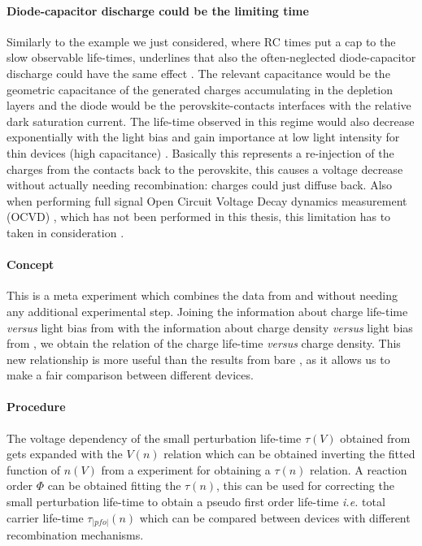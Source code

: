		\paragraph{Diode\hyp{}capacitor discharge could be the limiting time}
		Similarly to the example we just considered, where RC times put a cap to the slow observable life\hyp{}times,  underlines that also the often-neglected diode\hyp{}capacitor discharge could have the same effect \cite{Tvingstedt2017,Hellen2003}.
		The relevant capacitance would be the geometric capacitance of the generated charges accumulating in the depletion layers and the diode would be the perovskite-contacts interfaces with the relative dark saturation current.
		The life\hyp{}time observed in this regime would also decrease exponentially with the light bias \cite{Castaner1981} and gain importance at low light intensity for thin devices (high capacitance) \cite{Kiermasch2018}.
		Basically this represents a re\hyp{}injection of the charges from the contacts back to the perovskite, this causes a voltage decrease without actually needing recombination: charges could just diffuse back.
		Also when performing full signal Open Circuit Voltage Decay dynamics measurement (OCVD) \cite{Lederhandler1955,Mahan1981}, which has not been performed in this thesis, this limitation has to taken in consideration \cite{Tvingstedt2017,Pockett2017,Pockett2015,Kiermasch2018}.

		\FloatBarrier
		\newpage
		\label{characterization-tpvce}

		\paragraph{Concept}
		This is a meta experiment which combines the data from  and  without needing any additional experimental step.
		Joining the information about charge life\hyp{}time \textsl{versus} light bias from  with the information about charge density \textsl{versus} light bias from , we obtain the relation of the charge life\hyp{}time \textsl{versus} charge density.
		This new relationship is more useful than the results from bare , as it allows us to make a fair comparison between different devices.

		\paragraph{Procedure}
		The voltage dependency of the small perturbation life\hyp{}time $\tau(V)$ obtained from  gets expanded with the $V(n)$ relation which can be obtained inverting the fitted function of $n(V)$ from a  experiment for obtaining a $\tau(n)$ relation.
		A reaction order $\Phi$ can be obtained fitting the $\tau(n)$, this can be used for correcting the small perturbation life\hyp{}time to obtain a pseudo first order life\hyp{}time \textsl{i.e.} total carrier life\hyp{}time $\tau_|pfo|(n)$ which can be compared between devices with different recombination mechanisms.

